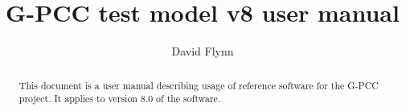 \documentclass[a4paper,11pt]{mpegdoc}
\title{G-PCC test model v8 user manual}
\author{%
	David Flynn
	\email{davidflynn@apple.com}
}
\begin{document}
\maketitle
\begin{abstract}
This document is a user manual describing usage of reference software
for the G-PCC project. It applies to version 8.0 of the software.
\end{abstract}

\tableofcontents









%
\end{document}
